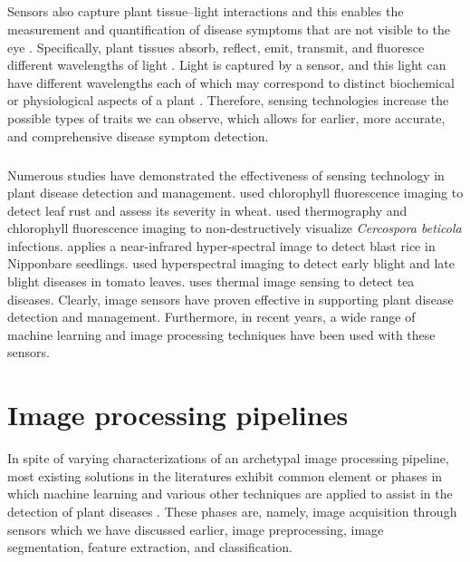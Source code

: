 \subparagraph{}
Sensors also capture plant tissue–light interactions and this enables the measurement and quantification of disease symptoms that are not visible to the eye \cite{liReviewImagingTechniques2014}. Specifically, plant tissues absorb, reflect, emit, transmit, and fluoresce different wavelengths of light \cite{liuPhotosyntheticPhysiologyBlue2021, gatesSpectralPropertiesPlants1965}. Light is captured by a sensor, and this light can have different wavelengths each of which may correspond to distinct biochemical or physiological aspects of a plant \cite{walshAdvancementsImagingSensors2024, chopraHyperspectralImagingCharacterize2025}. Therefore, sensing technologies increase the possible types of traits we can observe, which allows for earlier, more accurate, and comprehensive disease symptom detection. 

\subparagraph{}
Numerous studies have demonstrated the effectiveness of sensing technology in plant disease detection and management.  \cite{burlingQuantumYieldNonregulated2010} used chlorophyll fluorescence imaging to detect leaf rust and assess its severity in wheat.  \cite{chaerleThermalChlorophyllFluorescenceImaging2004} used thermography and chlorophyll fluorescence imaging to non-destructively visualize \emph{Cercospora beticola} infections. \cite{yanyangEarlyDetectionRice2012} applies a near-infrared hyper-spectral image to detect blast rice in Nipponbare seedlings. \cite{xieDetectionEarlyBlight2015} used hyperspectral imaging to detect early blight and late blight diseases in tomato leaves. \cite{yangTeaDiseasesDetection2019} uses thermal image sensing to detect tea diseases. Clearly, image sensors have proven effective in supporting plant disease detection and management. Furthermore, in recent years, a wide range of machine learning and image processing techniques have been used with these sensors.

\section{Image processing pipelines}
In spite of varying characterizations of an archetypal image processing pipeline, most existing solutions in the literatures exhibit common element or phases in which machine learning and various other techniques are applied to assist in the detection of plant diseases \cite{kitpoEarlyRiceDisease2018, khalidRealTimePlantHealth2023, camargoImageprocessingBasedAlgorithm2009, rahatPrecisionAgricultureTea2025, basavaiahTomatoLeafDisease2020, wenThermalImagingDigital2023, kumbharCropDiseaseDetection, kaurPlantsDiseaseIdentification2019, perez-sanzPlantPhenomicsOverview2017, alhiaryFastAccurateDetection2011, desaiEnhancingImageQuality2025}. These phases are, namely, image acquisition through sensors which we have discussed earlier, image preprocessing, image segmentation, feature extraction, and  classification. \cite{kitpoEarlyRiceDisease2018, khalidRealTimePlantHealth2023, camargoImageprocessingBasedAlgorithm2009, rahatPrecisionAgricultureTea2025, basavaiahTomatoLeafDisease2020, wenThermalImagingDigital2023}

